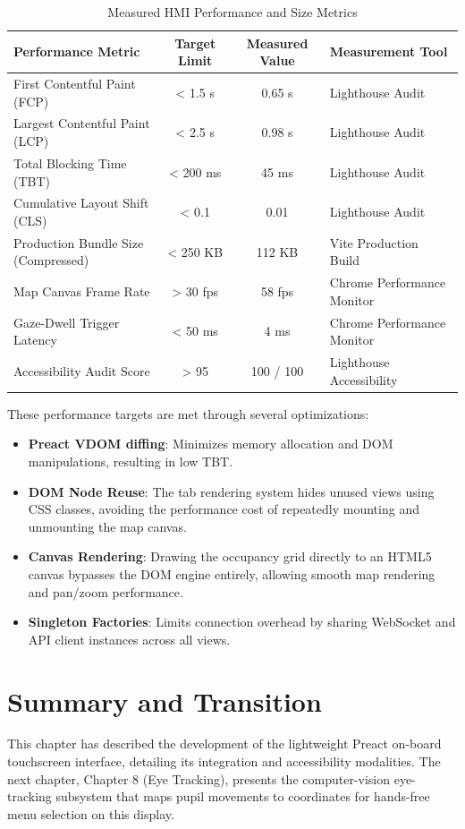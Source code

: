 \begin{table}[H]
\centering
\caption{Measured HMI Performance and Size Metrics}
\label{tab:perf-metrics}
\begin{tabularx}{\textwidth}{|>{\raggedright\arraybackslash}X|c|c|>{\raggedright\arraybackslash}X|}
\hline
\textbf{Performance Metric} & \textbf{Target Limit} & \textbf{Measured Value} & \textbf{Measurement Tool} \\ \hline
First Contentful Paint (FCP) & < 1.5 s & 0.65 s & Lighthouse Audit \\ \hline
Largest Contentful Paint (LCP) & < 2.5 s & 0.98 s & Lighthouse Audit \\ \hline
Total Blocking Time (TBT) & < 200 ms & 45 ms & Lighthouse Audit \\ \hline
Cumulative Layout Shift (CLS) & < 0.1 & 0.01 & Lighthouse Audit \\ \hline
Production Bundle Size (Compressed) & < 250 KB & 112 KB & Vite Production Build \\ \hline
Map Canvas Frame Rate & > 30 fps & 58 fps & Chrome Performance Monitor \\ \hline
Gaze-Dwell Trigger Latency & < 50 ms & 4 ms & Chrome Performance Monitor \\ \hline
Accessibility Audit Score & > 95 & 100 / 100 & Lighthouse Accessibility \\ \hline
\end{tabularx}
\end{table}

These performance targets are met through several optimizations:
\begin{itemize}
    \item \textbf{Preact VDOM diffing}: Minimizes memory allocation and DOM manipulations, resulting in low TBT.
    \item \textbf{DOM Node Reuse}: The tab rendering system hides unused views using CSS classes, avoiding the performance cost of repeatedly mounting and unmounting the map canvas.
    \item \textbf{Canvas Rendering}: Drawing the occupancy grid directly to an HTML5 canvas bypasses the DOM engine entirely, allowing smooth map rendering and pan/zoom performance.
    \item \textbf{Singleton Factories}: Limits connection overhead by sharing WebSocket and API client instances across all views.
\end{itemize}

\section{Summary and Transition}
This chapter has described the development of the lightweight Preact on-board touchscreen interface, detailing its integration and accessibility modalities. The next chapter, Chapter 8 (Eye Tracking), presents the computer-vision eye-tracking subsystem that maps pupil movements to coordinates for hands-free menu selection on this display.
